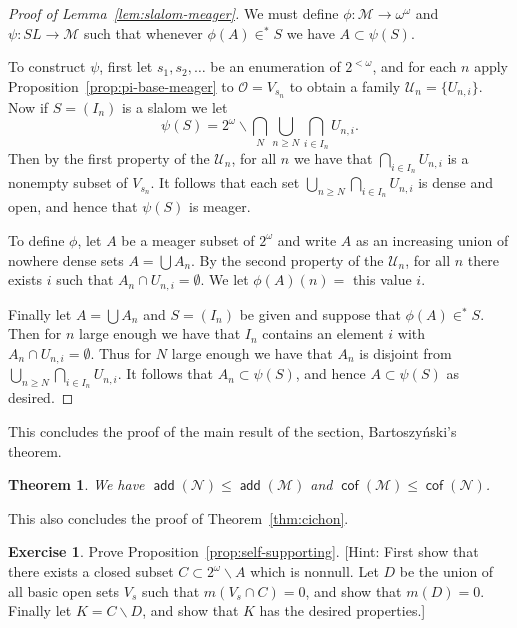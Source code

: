 \documentclass[11pt,oneside,a4paper]{amsbook}
\newcommand{\Null}{\mathcal N}
\newcommand{\Meager}{\mathcal M}
\DeclareMathOperator{\add}{\mathsf{add}}
\DeclareMathOperator{\cof}{\mathsf{cof}}
\theoremstyle{definition}
\newtheorem{exercise}{Exercise}[section]
\theoremstyle{plain}
\newtheorem{theorem}{Theorem}[section]
\theoremstyle{definition}
\theoremstyle{remark}
\numberwithin{equation}{section}
\numberwithin{figure}{section}
\begin{document}
\begin{proof}[Proof of Lemma~\ref{lem:slalom-meager}]
  We must define $\phi\colon\Meager\to\omega^\omega$ and $\psi\colon SL\to\Meager$ such that whenever $\phi(A)\in^*S$ we have $A\subset\psi(S)$.

  To construct $\psi$, first let $s_1,s_2,\ldots$ be an enumeration of $2^{<\omega}$, and for each $n$ apply Proposition~\ref{prop:pi-base-meager} to $\mathcal O=V_{s_n}$ to obtain a family $\mathcal U_n=\{U_{n,i}\}$. Now if $S=(I_n)$ is a slalom we let
  \[\psi(S)=2^\omega\smallsetminus\bigcap_N\bigcup_{n\geq N}\bigcap_{i\in I_n}U_{n,i}\text{.}
  \]
  Then by the first property of the $\mathcal U_n$, for all $n$ we have that $\bigcap_{i\in I_n}U_{n,i}$ is a nonempty subset of $V_{s_n}$. It follows that each set $\bigcup_{n\geq N}\bigcap_{i\in I_n}U_{n,i}$ is dense and open, and hence that $\psi(S)$ is meager.

  To define $\phi$, let $A$ be a meager subset of $2^\omega$ and write $A$ as an increasing union of nowhere dense sets $A=\bigcup A_n$. By the second property of the $\mathcal U_n$, for all $n$ there exists $i$ such that $A_n\cap U_{n,i}=\emptyset$. We let $\phi(A)(n)=$ this value $i$.

  Finally let $A=\bigcup A_n$ and $S=(I_n)$ be given and suppose that $\phi(A)\in^*S$. Then for $n$ large enough we have that $I_n$ contains an element $i$ with $A_n\cap U_{n,i}=\emptyset$. Thus for $N$ large enough we have that $A_n$ is disjoint from $\bigcup_{n\geq N}\bigcap_{i\in I_n}U_{n,i}$. It follows that $A_n\subset\psi(S)$, and hence $A\subset\psi(S)$ as desired.
\end{proof}

This concludes the proof of the main result of the section, Bartoszy\'nski's theorem.

\begin{theorem}
  We have $\add(\Null)\leq\add(\Meager)$ and $\cof(\Meager)\leq\cof(\Null)$.
\end{theorem}

This also concludes the proof of Theorem~\ref{thm:cichon}.

\begin{exercise}
  \label{exerc:self-supporting}
  Prove Proposition~\ref{prop:self-supporting}. [Hint: First show that there exists a closed subset $C\subset2^\omega\smallsetminus A$ which is nonnull. Let $D$ be the union of all basic open sets $V_s$ such that $m(V_s\cap C)=0$, and show that $m(D)=0$. Finally let $K=C\smallsetminus D$, and show that $K$ has the desired properties.]
\end{exercise}
\end{document}
